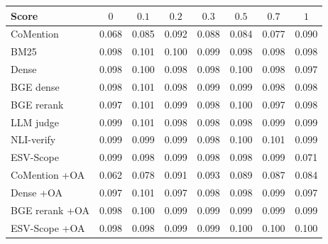 \setlength{\tabcolsep}{2.5pt}
\begin{tabular}{lccccccc}
\toprule
Score & $0$ & $0.1$ & $0.2$ & $0.3$ & $0.5$ & $0.7$ & $1$ \\
\midrule
CoMention & 0.068 & 0.085 & 0.092 & 0.088 & 0.084 & 0.077 & 0.090 \\
BM25 & 0.098 & 0.101 & 0.100 & 0.099 & 0.098 & 0.098 & 0.098 \\
Dense & 0.098 & 0.100 & 0.098 & 0.098 & 0.100 & 0.098 & 0.097 \\
BGE dense & 0.098 & 0.101 & 0.098 & 0.099 & 0.099 & 0.098 & 0.098 \\
BGE rerank & 0.097 & 0.101 & 0.099 & 0.098 & 0.100 & 0.097 & 0.098 \\
LLM judge & 0.099 & 0.101 & 0.098 & 0.098 & 0.098 & 0.099 & 0.099 \\
NLI-verify & 0.099 & 0.099 & 0.099 & 0.098 & 0.100 & 0.101 & 0.099 \\
ESV-Scope & 0.099 & 0.098 & 0.099 & 0.098 & 0.098 & 0.099 & 0.071 \\
\midrule
CoMention +OA & 0.062 & 0.078 & 0.091 & 0.093 & 0.089 & 0.087 & 0.084 \\
Dense +OA & 0.097 & 0.101 & 0.097 & 0.098 & 0.098 & 0.099 & 0.097 \\
BGE rerank +OA & 0.098 & 0.100 & 0.099 & 0.099 & 0.099 & 0.099 & 0.099 \\
ESV-Scope +OA & 0.098 & 0.098 & 0.099 & 0.099 & 0.100 & 0.100 & 0.100 \\
\bottomrule
\end{tabular}
